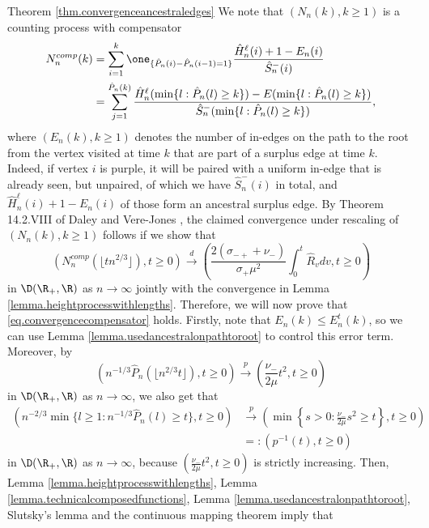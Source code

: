 \begin{proofof}{ Theorem \ref{thm.convergenceancestraledges}}
We note that $(N_n(k),k\geq 1)$ is a counting process with compensator 
\begin{align*}
    N_n^{comp}(k)&=\sum_{i=1}^k \one_{\{\hat{P}_n(i)-\hat{P}_n(i-1)=1\}}\frac{\hat{H}^\ell_n(i)+1-E_n(i)}{\hat{S}^-_n(i)}\\
    &=\sum_{j=1}^{\hat{P}_n(k)}\frac{\hat{H}^\ell_n(\min\{l:\hat{P}_n(l)\geq k\})-E(\min\{l:\hat{P}_n(l)\geq k\})}{\hat{S}^-_n(\min\{l:\hat{P}_n(l)\geq k\})},
\end{align*}
where $(E_n(k),k\geq 1)$ denotes the number of in-edges on the path to the root from the vertex visited at time $k$ that are part of a surplus edge at time $k$. Indeed, if vertex $i$ is purple, it will be paired with a uniform in-edge that is already seen, but unpaired, of which we have $\hat{S}^-_n(i)$ in total, and $\hat{H}^\ell_n(i)+1-E_n(i)$ of those form an ancestral surplus edge. By Theorem 14.2.VIII of Daley and Vere-Jones \cite{DaleyVereJones}, the claimed convergence under rescaling of $(N_n(k),k\geq 1)$ follows if we show that 
\begin{equation}\label{eq.convergencecompensator}
    \left(N_n^{comp}\left(\lfloor tn^{2/3}\rfloor \right), t\geq 0\right)\overset{d}{\to}\left(\frac{2(\sigma_{-+}+\nu_-)}{\sigma_+\mu^2} \int_0^t\hat{R}_v dv, t \geq 0\right)
\end{equation}
in $\D(\R_+,\R)$ as $n\to \infty$ jointly with the convergence in Lemma \ref{lemma.heightprocesswithlengths}. Therefore, we will now prove that \eqref{eq.convergencecompensator} holds. 
Firstly, note that $E_n(k)\leq E_n^t(k)$, so we can use Lemma \ref{lemma.usedancestralonpathtoroot} to control this error term. Moreover, by
$$\left(n^{-1/3}\hat{P}_n\left(\lfloor n^{2/3}t\rfloor \right),t\geq 0\right)\overset{p}{\to}\left(\frac{\nu_-}{2\mu}t^2,t\geq 0\right)$$
in $\D(\R_+,\R)$ as $n\to \infty$,
we also get that
\begin{align*}\left(n^{-2/3}\min\{l\geq 1:n^{-1/3}\hat{P}_n(l)\geq t\},t\geq 0\right)&\overset{p}{\to}\left(\min\left\{s>0: \frac{\nu_-}{2\mu}s^2\geq t\right \}, t\geq 0\right)\\
&=:\left(p^{-1}(t),t\geq 0\right) \end{align*}
in $\D(\R_+,\R)$ as $n\to \infty$, because $\left(\frac{\nu_-}{2\mu}t^2,t\geq 0\right)$ is strictly increasing. Then, Lemma \ref{lemma.heightprocesswithlengths}, Lemma \ref{lemma.technicalcomposedfunctions}, Lemma \ref{lemma.usedancestralonpathtoroot}, Slutsky's lemma and the continuous mapping theorem imply that 

\end{proofof}
